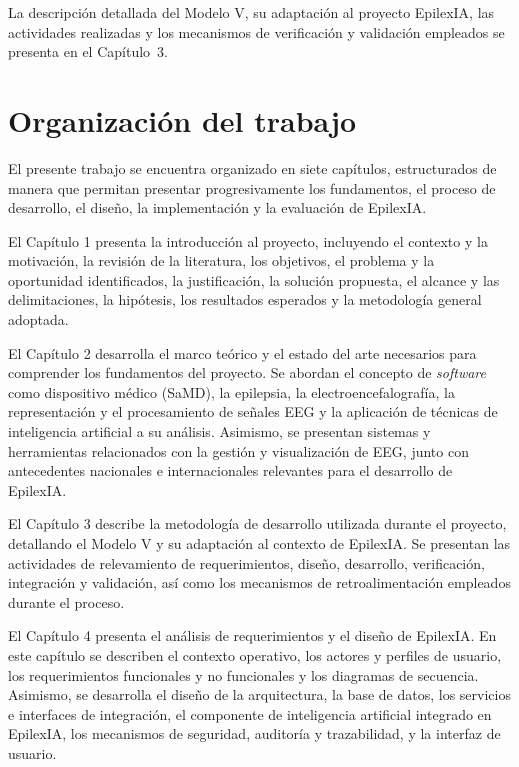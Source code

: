 La descripción detallada del Modelo V, su adaptación al proyecto EpilexIA,
las actividades realizadas y los mecanismos de verificación y validación
empleados se presenta en el Capítulo~3.

\section{Organización del trabajo}
\label{sec:organizacion}

El presente trabajo se encuentra organizado en siete capítulos, estructurados
de manera que permitan presentar progresivamente los fundamentos, el proceso
de desarrollo, el diseño, la implementación y la evaluación de EpilexIA.

El Capítulo 1 presenta la introducción al proyecto, incluyendo el contexto y
la motivación, la revisión de la literatura, los objetivos, el problema y la
oportunidad identificados, la justificación, la solución propuesta, el alcance
y las delimitaciones, la hipótesis, los resultados esperados y la metodología
general adoptada.

El Capítulo 2 desarrolla el marco teórico y el estado del arte necesarios para
comprender los fundamentos del proyecto. Se abordan el concepto de \textit{software}
como dispositivo médico (SaMD), la epilepsia, la electroencefalografía, la
representación y el procesamiento de señales EEG y la aplicación de técnicas
de inteligencia artificial a su análisis. Asimismo, se presentan sistemas y
herramientas relacionados con la gestión y visualización de EEG, junto con
antecedentes nacionales e internacionales relevantes para el desarrollo de
EpilexIA.

El Capítulo 3 describe la metodología de desarrollo utilizada durante el
proyecto, detallando el Modelo V y su adaptación al contexto de EpilexIA.
Se presentan las actividades de relevamiento de requerimientos, diseño,
desarrollo, verificación, integración y validación, así como los mecanismos
de retroalimentación empleados durante el proceso.

El Capítulo 4 presenta el análisis de requerimientos y el diseño de EpilexIA.
En este capítulo se describen el contexto operativo, los actores y perfiles de
usuario, los requerimientos funcionales y no funcionales y los diagramas de
secuencia. Asimismo, se desarrolla el diseño de la arquitectura, la base de
datos, los servicios e interfaces de integración, el componente de inteligencia
artificial integrado en EpilexIA, los mecanismos de seguridad, auditoría y
trazabilidad, y la interfaz de usuario.

